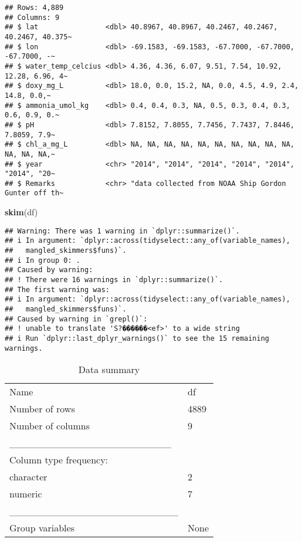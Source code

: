 \documentclass[
]{article}
\newenvironment{Shaded}{\begin{snugshade}}{\end{snugshade}}
\newcommand{\FunctionTok}[1]{\textcolor[rgb]{0.13,0.29,0.53}{\textbf{#1}}}
\newcommand{\NormalTok}[1]{#1}
\begin{document}
\begin{verbatim}
## Rows: 4,889
## Columns: 9
## $ lat                <dbl> 40.8967, 40.8967, 40.2467, 40.2467, 40.2467, 40.375~
## $ lon                <dbl> -69.1583, -69.1583, -67.7000, -67.7000, -67.7000, -~
## $ water_temp_celcius <dbl> 4.36, 4.36, 6.07, 9.51, 7.54, 10.92, 12.28, 6.96, 4~
## $ doxy_mg_L          <dbl> 18.0, 0.0, 15.2, NA, 0.0, 4.5, 4.9, 2.4, 14.8, 0.0,~
## $ ammonia_umol_kg    <dbl> 0.4, 0.4, 0.3, NA, 0.5, 0.3, 0.4, 0.3, 0.6, 0.9, 0.~
## $ pH                 <dbl> 7.8152, 7.8055, 7.7456, 7.7437, 7.8446, 7.8059, 7.9~
## $ chl_a_mg_L         <dbl> NA, NA, NA, NA, NA, NA, NA, NA, NA, NA, NA, NA, NA,~
## $ year               <chr> "2014", "2014", "2014", "2014", "2014", "2014", "20~
## $ Remarks            <chr> "data collected from NOAA Ship Gordon Gunter off th~
\end{verbatim}

\begin{Shaded}
\begin{Highlighting}[]
\FunctionTok{skim}\NormalTok{(df)}
\end{Highlighting}
\end{Shaded}

\begin{verbatim}
## Warning: There was 1 warning in `dplyr::summarize()`.
## i In argument: `dplyr::across(tidyselect::any_of(variable_names),
##   mangled_skimmers$funs)`.
## i In group 0: .
## Caused by warning:
## ! There were 16 warnings in `dplyr::summarize()`.
## The first warning was:
## i In argument: `dplyr::across(tidyselect::any_of(variable_names),
##   mangled_skimmers$funs)`.
## Caused by warning in `grepl()`:
## ! unable to translate 'S?������<ef>' to a wide string
## i Run `dplyr::last_dplyr_warnings()` to see the 15 remaining warnings.
\end{verbatim}

\begin{longtable}[]{@{}ll@{}}
\caption{Data summary}\tabularnewline
\toprule\noalign{}
\endfirsthead
\endhead
\bottomrule\noalign{}
\endlastfoot
Name & df \\
Number of rows & 4889 \\
Number of columns & 9 \\
\_\_\_\_\_\_\_\_\_\_\_\_\_\_\_\_\_\_\_\_\_\_\_ & \\
Column type frequency: & \\
character & 2 \\
numeric & 7 \\
\_\_\_\_\_\_\_\_\_\_\_\_\_\_\_\_\_\_\_\_\_\_\_\_ & \\
Group variables & None \\
\end{longtable}
\end{document}
